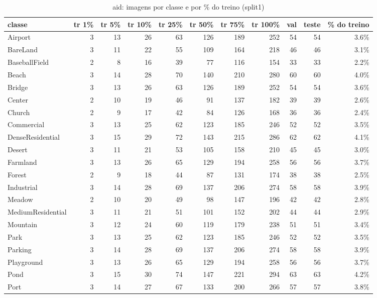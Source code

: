 \begin{table}[h]\centering\small
\caption{aid: imagens por classe e por \% do treino (split1)}
\begin{tabular}{lrrrrrrrrrr}\toprule
classe & tr 1\% & tr 5\% & tr 10\% & tr 25\% & tr 50\% & tr 75\% & tr 100\% & val & teste & \% do treino \\\midrule
Airport & 3 & 13 & 26 & 63 & 126 & 189 & 252 & 54 & 54 & 3.6\% \\
BareLand & 3 & 11 & 22 & 55 & 109 & 164 & 218 & 46 & 46 & 3.1\% \\
BaseballField & 2 & 8 & 16 & 39 & 77 & 116 & 154 & 33 & 33 & 2.2\% \\
Beach & 3 & 14 & 28 & 70 & 140 & 210 & 280 & 60 & 60 & 4.0\% \\
Bridge & 3 & 13 & 26 & 63 & 126 & 189 & 252 & 54 & 54 & 3.6\% \\
Center & 2 & 10 & 19 & 46 & 91 & 137 & 182 & 39 & 39 & 2.6\% \\
Church & 2 & 9 & 17 & 42 & 84 & 126 & 168 & 36 & 36 & 2.4\% \\
Commercial & 3 & 13 & 25 & 62 & 123 & 185 & 246 & 52 & 52 & 3.5\% \\
DenseResidential & 3 & 15 & 29 & 72 & 143 & 215 & 286 & 62 & 62 & 4.1\% \\
Desert & 3 & 11 & 21 & 53 & 105 & 158 & 210 & 45 & 45 & 3.0\% \\
Farmland & 3 & 13 & 26 & 65 & 129 & 194 & 258 & 56 & 56 & 3.7\% \\
Forest & 2 & 9 & 18 & 44 & 87 & 131 & 174 & 38 & 38 & 2.5\% \\
Industrial & 3 & 14 & 28 & 69 & 137 & 206 & 274 & 58 & 58 & 3.9\% \\
Meadow & 2 & 10 & 20 & 49 & 98 & 147 & 196 & 42 & 42 & 2.8\% \\
MediumResidential & 3 & 11 & 21 & 51 & 101 & 152 & 202 & 44 & 44 & 2.9\% \\
Mountain & 3 & 12 & 24 & 60 & 119 & 179 & 238 & 51 & 51 & 3.4\% \\
Park & 3 & 13 & 25 & 62 & 123 & 185 & 246 & 52 & 52 & 3.5\% \\
Parking & 3 & 14 & 28 & 69 & 137 & 206 & 274 & 58 & 58 & 3.9\% \\
Playground & 3 & 13 & 26 & 65 & 129 & 194 & 258 & 56 & 56 & 3.7\% \\
Pond & 3 & 15 & 30 & 74 & 147 & 221 & 294 & 63 & 63 & 4.2\% \\
Port & 3 & 14 & 27 & 67 & 133 & 200 & 266 & 57 & 57 & 3.8\% \\

\end{tabular}
\end{table}
